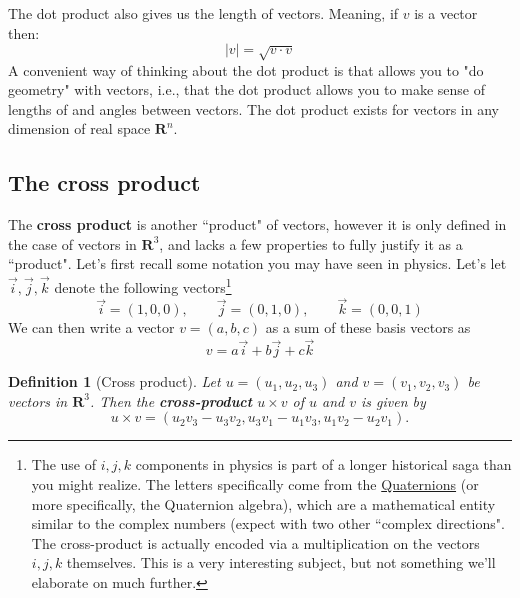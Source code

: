 \documentclass[12pt]{article}
\numberwithin{equation}{subsection}
\numberwithin{figure}{subsection}
\newtheorem{defn}[subsection]{Definition}
\theoremstyle{note}
\begin{document}
{The dot product also gives us the {length} of vectors. Meaning, if $v$ is a vector then: \begin{equation} |v|=\sqrt{v\cdot v}\end{equation}
A convenient way of thinking about the dot product is that allows you to "do geometry" with vectors, i.e., that the dot product allows you to make sense of lengths of and angles between vectors. The dot product exists for vectors in any dimension of real space $\mathbf{R}^n$.

\subsection{The cross product} The \textbf{cross product} is another ``product" of vectors, however it is only defined in the case of vectors in $\mathbf{R}^3$, and lacks a few properties to fully justify it as a ``product". Let's first recall some notation you may have seen in physics. Let's let $\vec{i},\vec{j},\vec{k}$ denote the following vectors\footnote{The use of $i,j,k$ components in physics is part of a longer historical saga than you might realize. The letters specifically come from the \href{https://en.wikipedia.org/wiki/Quaternion}{Quaternions} (or more specifically, the Quaternion algebra), which are a mathematical entity similar to the complex numbers (expect with two other ``complex directions". The cross-product is actually encoded via a multiplication on the vectors $i,j,k$ themselves. This is a very interesting subject, but not something we'll elaborate on much further.}
\[ \vec{i}=(1,0,0), \qquad \vec{j}=(0,1,0), \qquad \vec{k}=(0,0,1)\]
We can then write a vector $v=(a,b,c)$ as a sum of these basis vectors as \[ v=a\vec{i}+b\vec{j}+c\vec{k}\]

\begin{defn}[Cross product] Let $u=(u_1,u_2,u_3)$ and $v=(v_1,v_2,v_3)$  be vectors in $\mathbf{R}^3$. Then the \textbf{cross-product} $u\times v$ of $u$ and $v$ is given by \begin{equation} u\times v= (u_2v_3 - u_3v_2, u_3v_1-u_1v_3, u_1v_2-u_2 v_1).\label{cross-prod-defn}\end{equation}
\end{defn}

}
\end{document}

